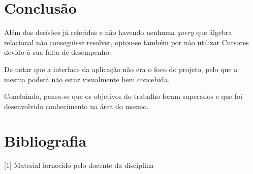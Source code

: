 \documentclass[10pt,portuguese]{article}
\begin{document}
\section{Conclusão}

\par Além das decisões já referidas e não havendo nenhuma \textit{query} que álgebra relacional não conseguisse resolver, optou-se também por não utilizar Cursores devido à sua falta de desempenho.

\par De notar que a interface da aplicação não era o foco do projeto, pelo que a mesma poderá não estar visualmente bem concebida.

\par Concluindo, pensa-se que os objetivos do trabalho foram superados e que foi desenvolvido conhecimento na área do mesmo. 

\clearpage

\section{Bibliografia}





\vspace{5mm} %

[1] Material fornecido pelo docente da disciplina
\end{document}
